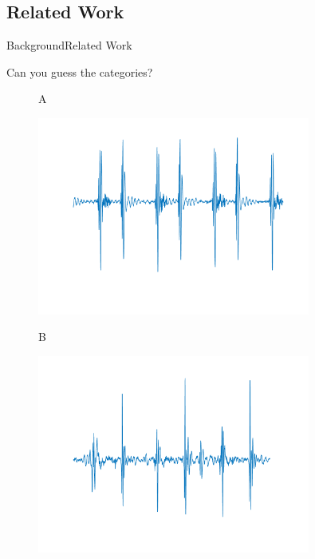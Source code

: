 \documentclass[10pt]{beamer}
\begin{document}

\subsection{Related Work}

\begin{frame}{Background}{Related Work}

\begin{block}{Can you guess the categories?}
	
	
	\vspace{-0.25cm}
	\begin{figure}
		A
		
		\includegraphics[width=0.8\textwidth,height=0.45\textheight]{AAUgraphics/question.png}
		
	\end{figure}
	
	\vspace{-2.0cm}
	\begin{figure}
		B
		\vspace{-0.04cm}
		
		\includegraphics[width=0.8\textwidth,height=0.40\textheight]{AAUgraphics/question2.png}
		
	\end{figure}
	
\end{block}

\end{frame}
\end{document}

